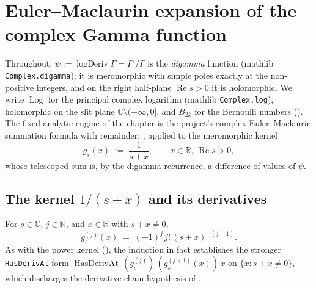 %

\chapter{Euler--Maclaurin expansion of the complex Gamma function}
\label{cha:gamma_stirling}

Throughout, $\psi := \operatorname{logDeriv}\Gamma = \Gamma'/\Gamma$ is the
\emph{digamma} function (mathlib \texttt{Complex.digamma}); it is meromorphic with
simple poles exactly at the non-positive integers, and on the right half-plane
$\operatorname{Re}s>0$ it is holomorphic. We write $\operatorname{Log}$ for the
principal complex logarithm (mathlib \texttt{Complex.log}), holomorphic on the slit
plane $\mathbb{C}\setminus(-\infty,0]$, and $B_{2k}$ for the Bernoulli numbers
(). The fixed analytic engine of the chapter is the project's
complex Euler--Maclaurin summation formula with remainder, ,
applied to the meromorphic kernel
\[
  g_s(x) \;:=\; \frac{1}{s+x}, \qquad x\in\mathbb{R},\ \operatorname{Re}s>0 ,
\]
whose telescoped sum is, by the digamma recurrence, a difference of values of $\psi$.

\section{The kernel \texorpdfstring{$1/(s+x)$}{1/(s+x)} and its derivatives}
\label{sec:gs_kernel}

\begin{lemma}
\label{lem:gs_iteratedDeriv}
\leanok
For $s\in\mathbb{C}$, $j\in\mathbb{N}$, and $x\in\mathbb{R}$ with $s+x\neq0$,
\[
  g_s^{(j)}(x) \;=\; (-1)^{j}\,j!\,(s+x)^{-(j+1)} .
\]
As with the power kernel (), the induction in fact
establishes the stronger \texttt{HasDerivAt} form
$\operatorname{HasDerivAt}\,(g_s^{(j)})\,(g_s^{(j+1)}(x))\,x$ on
$\{x : s+x\neq0\}$, which discharges the derivative-chain hypothesis of
.
\end{lemma}

